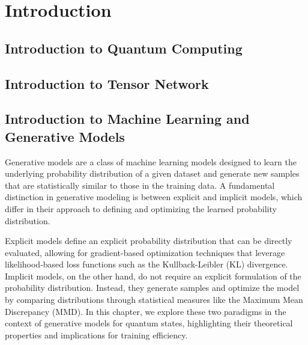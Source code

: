 \chapter{Introduction}

\section{Introduction to Quantum Computing}

\lipsum[1-2] 
\cite{rudolph_generation_2022}
\cite{schollwock_density-matrix_2011}
\cite{mangini_low-variance_2024}
\cite{rudolph_trainability_2024}
\cite{collura_tensor_2024}
\cite{garcia-perez_learning_2021}

\section{Introduction to Tensor Network}

\lipsum[1-2]

\section{Introduction to Machine Learning and Generative Models}

Generative models are a class of machine learning models designed to learn the underlying probability distribution of a given dataset and generate new samples that are statistically similar to those in the training data. A fundamental distinction in generative modeling is between explicit and implicit models, which differ in their approach to defining and optimizing the learned probability distribution.

Explicit models define an explicit probability distribution that can be directly evaluated, allowing for gradient-based optimization techniques that leverage likelihood-based loss functions such as the Kullback-Leibler (KL) divergence. Implicit models, on the other hand, do not require an explicit formulation of the probability distribution. Instead, they generate samples and optimize the model by comparing distributions through statistical measures like the Maximum Mean Discrepancy (MMD). In this chapter, we explore these two paradigms in the context of generative models for quantum states, highlighting their theoretical properties and implications for training efficiency.
